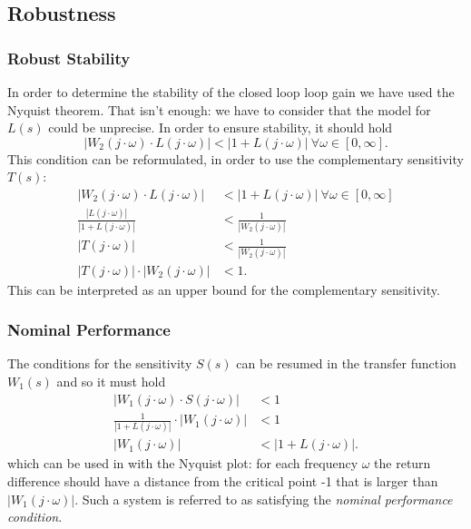 \documentclass[a4paper,12 pt]{article}
\numberwithin{equation}{section}
\theoremstyle{definition}
\theoremstyle{remark}
\theoremstyle{definition}
\theoremstyle{definition}
\theoremstyle{definition}
\theoremstyle{remark}
\begin{document}
\newpage
\subsection{Robustness}

\subsubsection{Robust Stability}
In order to determine the stability of the closed loop loop gain we have used the Nyquist theorem. That isn't enough: we have to consider that the model for $L(s)$ could be unprecise. In order to ensure stability, it should hold
\begin{equation}
|W_2(j\cdot \omega)\cdot L(j\cdot \omega)|<|1+L(j\cdot \omega)| \ \forall \omega \in [0,\infty].
\end{equation}
This condition can be reformulated, in order to use the complementary sensitivity $T(s)$:
\begin{equation}
\begin{split}
|W_2(j\cdot \omega)\cdot L(j\cdot \omega)|&<|1+L(j\cdot \omega)| \ \forall \omega \in [0,\infty]\\
\frac{|L(j\cdot \omega)|}{|1+L(j\cdot \omega)|}&<\frac{1}{|W_2(j\cdot \omega)|}\\
|T(j\cdot \omega)|&<\frac{1}{|W_2(j\cdot \omega)|}\\
|T(j\cdot \omega)|\cdot |W_2(j\cdot \omega)|&<1.
\end{split}
\end{equation}
This can be interpreted as an upper bound for the complementary sensitivity.

\subsubsection{Nominal Performance}
The conditions for the sensitivity $S(s)$ can be resumed in the transfer function $W_1(s)$ and so it must hold
\begin{equation}
\begin{split}
|W_1(j\cdot \omega)\cdot S(j\cdot \omega)|&<1\\
\frac{1}{|1+L(j\cdot \omega)|}\cdot |W_1(j\cdot \omega)|&<1\\
|W_1(j\cdot \omega)|&<|1+L(j\cdot \omega)|.
\end{split}
\end{equation}
which can be used in with the Nyquist plot: for each frequency $\omega$ the return difference should have a distance from the critical point -1 that is larger than $|W_1(j\cdot \omega)|$. Such a system is referred to as satisfying the \textit{nominal performance condition}.
\end{document}
